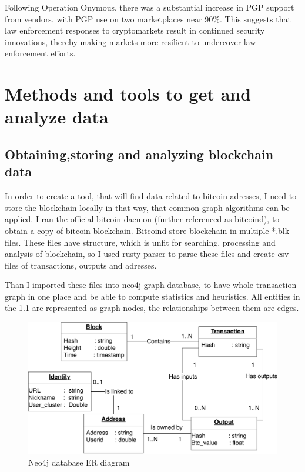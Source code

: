 \documentclass[
  digital, %
  table,   %
  lof,     %
  lot,     %
  oneside
]{fithesis3}
\begin{document}
Following Operation Onymous, there was a substantial increase in PGP support from vendors, with PGP use on two marketplaces near 90\%.
This suggests that law enforcement responses to cryptomarkets result in continued security innovations, thereby making markets more resilient to undercover law enforcement efforts.

\chapter{Methods and tools to get and analyze data}
\section{Obtaining,storing and analyzing blockchain data}
In order to create a tool, that will find data related to bitcoin adresses, I need to store the blockchain locally in that way, that common graph algorithms can be applied.
I ran the official bitcoin daemon (further referenced as bitcoind), to obtain a copy of bitcoin blockchain. Bitcoind store blockchain in multiple *.blk files.
These files have structure, which is unfit for searching, processing and analysis of blockchain, so I used rusty-parser to parse these files and create csv files of transactions, outputs and adresses.

Than I imported these files into neo4j graph database, to have whole transaction graph in one place and be able to compute statistics and heuristics.
All entities in the \ref{neo4jschema} are represented as graph nodes, the relationships between them are edges.
\begin{figure}[h]
    \centering
    \includegraphics[width=1\textwidth]{neo4j-schema}
    \caption{Neo4j database ER diagram}
    \label{neo4jschema}
\end{figure}
\end{document}
